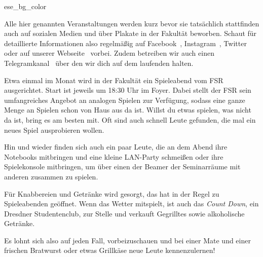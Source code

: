 \label{cha:veranstaltungen}

\begin{awesomeblock}{2pt}{\faInfoCircle}{ese_bg_color}
    \begin{minipage}[t]{.82\textwidth}
        Alle hier genannten Veranstaltungen werden kurz bevor sie tatsächlich
        stattfinden auch auf sozialen Medien und über Plakate in der Fakultät
        beworben. Schaut für detaillierte Informationen also regelmäßig auf
        Facebook~,
        Instagram~,
        Twitter~ oder auf unserer
        Webseite~ vorbei. Zudem betreiben wir auch
        einen Telegramkanal~ über den wir dich auf dem
        laufenden halten.
    \end{minipage}
\end{awesomeblock}


Etwa einmal im Monat wird in der Fakultät ein Spieleabend vom FSR ausgerichtet. Start ist jeweils um 18:30 Uhr im Foyer. Dabei stellt der FSR sein umfangreiches Angebot an analogen Spielen zur Verfügung, sodass eine ganze Menge an Spielen schon von Haus aus da ist. Willst du etwas spielen, was nicht da ist, bring es am besten mit. Oft sind auch schnell Leute gefunden, die mal ein neues Spiel ausprobieren wollen.

Hin und wieder finden sich auch ein paar Leute, die an dem Abend ihre Notebooks mitbringen und eine kleine LAN-Party schmeißen oder ihre Spielekonsole mitbringen, um über einen der Beamer der Seminarräume mit anderen zusammen zu spielen.

Für Knabbereien und Getränke wird gesorgt, das \ascii{} hat in der Regel zu Spieleabenden geöffnet. Wenn das Wetter mitspielt, ist auch das \emph{Count Down}, ein Dresdner Studentenclub, zur Stelle und verkauft Gegrilltes sowie alkoholische Getränke.

Es lohnt sich also auf jeden Fall, vorbeizuschauen und bei einer Mate und einer frischen Bratwurst oder etwas Grillkäse neue Leute kennenzulernen!

\pagebreak

%

